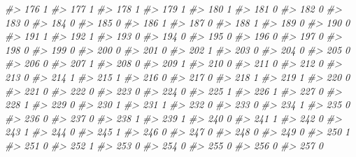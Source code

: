 \documentclass[]{book}
\newenvironment{Shaded}{\begin{snugshade}}{\end{snugshade}}
\newcommand{\CommentTok}[1]{\textcolor[rgb]{0.56,0.35,0.01}{\textit{#1}}}
\begin{document}
\begin{Shaded}
\begin{Highlighting}[]
\CommentTok{#> 176           1}
\CommentTok{#> 177           1}
\CommentTok{#> 178           1}
\CommentTok{#> 179           1}
\CommentTok{#> 180           1}
\CommentTok{#> 181           0}
\CommentTok{#> 182           0}
\CommentTok{#> 183           0}
\CommentTok{#> 184           0}
\CommentTok{#> 185           0}
\CommentTok{#> 186           1}
\CommentTok{#> 187           0}
\CommentTok{#> 188           1}
\CommentTok{#> 189           0}
\CommentTok{#> 190           0}
\CommentTok{#> 191           1}
\CommentTok{#> 192           1}
\CommentTok{#> 193           0}
\CommentTok{#> 194           0}
\CommentTok{#> 195           0}
\CommentTok{#> 196           0}
\CommentTok{#> 197           0}
\CommentTok{#> 198           0}
\CommentTok{#> 199           0}
\CommentTok{#> 200           0}
\CommentTok{#> 201           0}
\CommentTok{#> 202           1}
\CommentTok{#> 203           0}
\CommentTok{#> 204           0}
\CommentTok{#> 205           0}
\CommentTok{#> 206           0}
\CommentTok{#> 207           1}
\CommentTok{#> 208           0}
\CommentTok{#> 209           1}
\CommentTok{#> 210           0}
\CommentTok{#> 211           0}
\CommentTok{#> 212           0}
\CommentTok{#> 213           0}
\CommentTok{#> 214           1}
\CommentTok{#> 215           1}
\CommentTok{#> 216           0}
\CommentTok{#> 217           0}
\CommentTok{#> 218           1}
\CommentTok{#> 219           1}
\CommentTok{#> 220           0}
\CommentTok{#> 221           0}
\CommentTok{#> 222           0}
\CommentTok{#> 223           0}
\CommentTok{#> 224           0}
\CommentTok{#> 225           1}
\CommentTok{#> 226           1}
\CommentTok{#> 227           0}
\CommentTok{#> 228           1}
\CommentTok{#> 229           0}
\CommentTok{#> 230           1}
\CommentTok{#> 231           1}
\CommentTok{#> 232           0}
\CommentTok{#> 233           0}
\CommentTok{#> 234           1}
\CommentTok{#> 235           0}
\CommentTok{#> 236           0}
\CommentTok{#> 237           0}
\CommentTok{#> 238           1}
\CommentTok{#> 239           1}
\CommentTok{#> 240           0}
\CommentTok{#> 241           1}
\CommentTok{#> 242           0}
\CommentTok{#> 243           1}
\CommentTok{#> 244           0}
\CommentTok{#> 245           1}
\CommentTok{#> 246           0}
\CommentTok{#> 247           0}
\CommentTok{#> 248           0}
\CommentTok{#> 249           0}
\CommentTok{#> 250           1}
\CommentTok{#> 251           0}
\CommentTok{#> 252           1}
\CommentTok{#> 253           0}
\CommentTok{#> 254           0}
\CommentTok{#> 255           0}
\CommentTok{#> 256           0}
\CommentTok{#> 257           0}

\end{Highlighting}
\end{Shaded}
\end{document}
